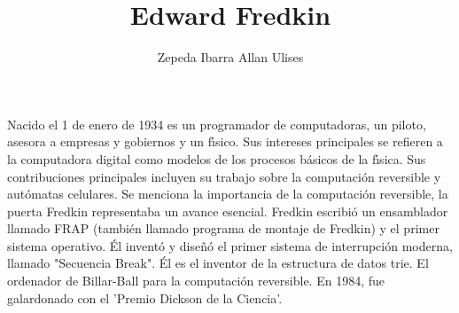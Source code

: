 \documentclass[a4paper,10pt]{article}
\title{Edward Fredkin}
\author{Zepeda Ibarra Allan Ulises}
\begin{document}
\maketitle

Nacido el 1 de enero de 1934 es un programador de computadoras, un piloto, asesora a empresas y gobiernos y un f\'{\i}sico. 
Sus intereses principales se refieren a la computadora digital como modelos de los procesos b\'asicos de la f\'{\i}sica. 
Sus contribuciones principales incluyen su trabajo sobre la computaci\'on reversible y aut\'omatas celulares.
Se menciona la importancia de la computaci\'on reversible, la puerta Fredkin representaba un avance esencial. 
Fredkin escribi\'o un ensamblador llamado FRAP (tambi\'en llamado programa de montaje de Fredkin) y el primer sistema operativo. 
 \'El invent\'o y dise\~n\'o el primer sistema de interrupción moderna, llamado "Secuencia Break".
\'El es el inventor de la estructura de datos trie. El ordenador de Billar-Ball para la computaci\'on reversible.
En 1984, fue galardonado con el 'Premio Dickson de la Ciencia'.
\end{document}
